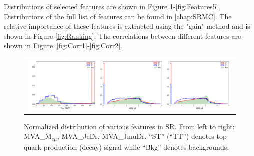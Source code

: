 \begin{table}[th]
\sffamily
\centering
\caption{Features only used by \ac{BDT} trained in \ac{SR}1}
\label{tab:SR1Features}
\end{table}

\begin{table}[th]
\sffamily
\centering
\caption{Features only used by \ac{BDT} trained in \ac{SR}2}
\label{tab:SR2Features}
\end{table}

Distributions of selected features are shown in Figure \ref{fig:Features1}-\ref{fig:Features5}. Distributions of the full list of features can be found in \autoref{chap:SRMC}. The relative importance of these features is extracted using the "gain" method and is shown in Figure \ref{fig:Ranking}. The correlations between different features are shown in Figure~\ref{fig:Corr1}-\ref{fig:Corr2}.

\begin{figure}[tbh!]
 \begin{center}
 \begin{tabular}{c}
 \includegraphics[width=0.99\textwidth]{figures/Part3/BDT/Features1}\\
 \end{tabular}
 \caption{Normalized distribution of various features in SR. From left to right: MVA\_M$_{e\mu}$, MVA\_JeDr, MVA\_JmuDr. ``ST'' (``TT'') denotes top quark production (decay) signal while ``Bkg'' denotes backgrounds.}
 \label{fig:Features1}
 \end{center}
\end{figure}

